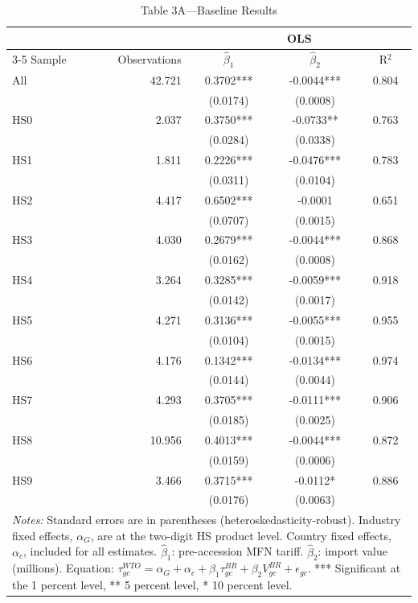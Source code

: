 \begin{table}[htbp]
\centering
\small
\caption{Table 3A---Baseline Results}
\label{tab:table3a}
\begin{tabular}{lrccc}
\toprule
& & \multicolumn{3}{c}{OLS} \\
\cmidrule(lr){3-5}
Sample & Observations & $\hat{\beta}_1$ & $\hat{\beta}_2$ & R$^2$ \\
\midrule
All & 42.721 & 0.3702*** & -0.0044*** & 0.804 \\
 & & (0.0174) & (0.0008) & \\
\addlinespace[6pt]
HS0 & 2.037 & 0.3750*** & -0.0733** & 0.763 \\
 & & (0.0284) & (0.0338) & \\
\addlinespace
HS1 & 1.811 & 0.2226*** & -0.0476*** & 0.783 \\
 & & (0.0311) & (0.0104) & \\
\addlinespace
HS2 & 4.417 & 0.6502*** & -0.0001 & 0.651 \\
 & & (0.0707) & (0.0015) & \\
\addlinespace
HS3 & 4.030 & 0.2679*** & -0.0044*** & 0.868 \\
 & & (0.0162) & (0.0008) & \\
\addlinespace
HS4 & 3.264 & 0.3285*** & -0.0059*** & 0.918 \\
 & & (0.0142) & (0.0017) & \\
\addlinespace
HS5 & 4.271 & 0.3136*** & -0.0055*** & 0.955 \\
 & & (0.0104) & (0.0015) & \\
\addlinespace
HS6 & 4.176 & 0.1342*** & -0.0134*** & 0.974 \\
 & & (0.0144) & (0.0044) & \\
\addlinespace
HS7 & 4.293 & 0.3705*** & -0.0111*** & 0.906 \\
 & & (0.0185) & (0.0025) & \\
\addlinespace
HS8 & 10.956 & 0.4013*** & -0.0044*** & 0.872 \\
 & & (0.0159) & (0.0006) & \\
\addlinespace
HS9 & 3.466 & 0.3715*** & -0.0112* & 0.886 \\
 & & (0.0176) & (0.0063) & \\
\bottomrule
\multicolumn{5}{p{0.95\linewidth}}{\footnotesize
 \textit{Notes:} Standard errors are in parentheses
 (heteroskedasticity-robust).
 Industry fixed effects, $\alpha_G$, are at the
 two-digit HS product level.
 Country fixed effects, $\alpha_c$, included for all estimates.
 $\hat{\beta}_1$: pre-accession MFN tariff.
 $\hat{\beta}_2$: import value (millions).
 Equation: $\tau_{gc}^{WTO} = \alpha_G + \alpha_c
 + \beta_1 \tau_{gc}^{BR} + \beta_2 V_{gc}^{BR} + \epsilon_{gc}$.
 *** Significant at the 1 percent level,
 ** 5 percent level, * 10 percent level.}
\end{tabular}
\end{table}
